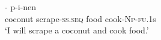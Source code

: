 \ea  
\gll
{}%
%
%
- %
%
p-i-nen \\
coconut  scrape-\textsc{ss.seq} food  cook-\textsc{Np-fu}.1s      \\
\glt`I will scrape a coconut and cook food.'
\z